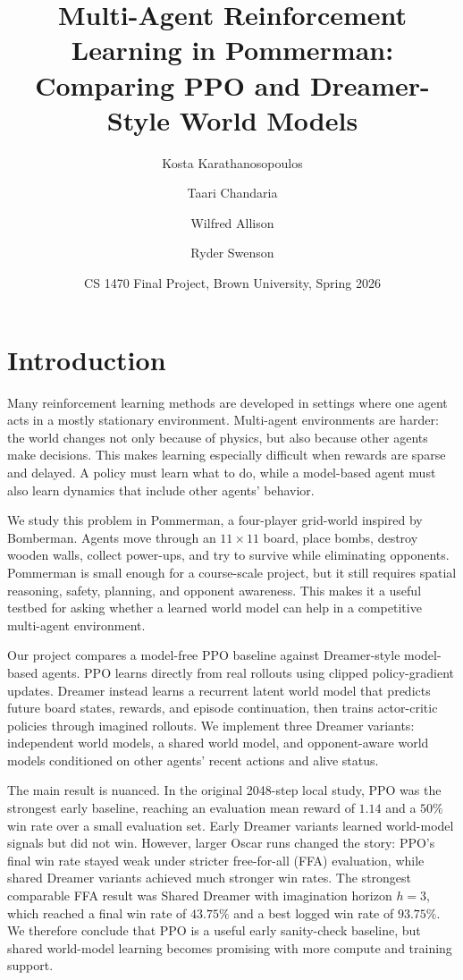 \documentclass[11pt]{article}
\title{Multi-Agent Reinforcement Learning in Pommerman: Comparing PPO and Dreamer-Style World Models}
\author{Kosta Karathanosopoulos \and Taari Chandaria \and Wilfred Allison \and Ryder Swenson}
\date{CS 1470 Final Project, Brown University, Spring 2026}
\begin{document}
\maketitle

\section{Introduction}

Many reinforcement learning methods are developed in settings where one agent acts in a mostly stationary environment. Multi-agent environments are harder: the world changes not only because of physics, but also because other agents make decisions. This makes learning especially difficult when rewards are sparse and delayed. A policy must learn what to do, while a model-based agent must also learn dynamics that include other agents' behavior.

We study this problem in Pommerman, a four-player grid-world inspired by Bomberman. Agents move through an $11 \times 11$ board, place bombs, destroy wooden walls, collect power-ups, and try to survive while eliminating opponents. Pommerman is small enough for a course-scale project, but it still requires spatial reasoning, safety, planning, and opponent awareness. This makes it a useful testbed for asking whether a learned world model can help in a competitive multi-agent environment.

Our project compares a model-free PPO baseline against Dreamer-style model-based agents. PPO learns directly from real rollouts using clipped policy-gradient updates. Dreamer instead learns a recurrent latent world model that predicts future board states, rewards, and episode continuation, then trains actor-critic policies through imagined rollouts. We implement three Dreamer variants: independent world models, a shared world model, and opponent-aware world models conditioned on other agents' recent actions and alive status.

The main result is nuanced. In the original 2048-step local study, PPO was the strongest early baseline, reaching an evaluation mean reward of $1.14$ and a $50\%$ win rate over a small evaluation set. Early Dreamer variants learned world-model signals but did not win. However, larger Oscar runs changed the story: PPO's final win rate stayed weak under stricter free-for-all (FFA) evaluation, while shared Dreamer variants achieved much stronger win rates. The strongest comparable FFA result was Shared Dreamer with imagination horizon $h=3$, which reached a final win rate of $43.75\%$ and a best logged win rate of $93.75\%$. We therefore conclude that PPO is a useful early sanity-check baseline, but shared world-model learning becomes promising with more compute and training support.
\end{document}
